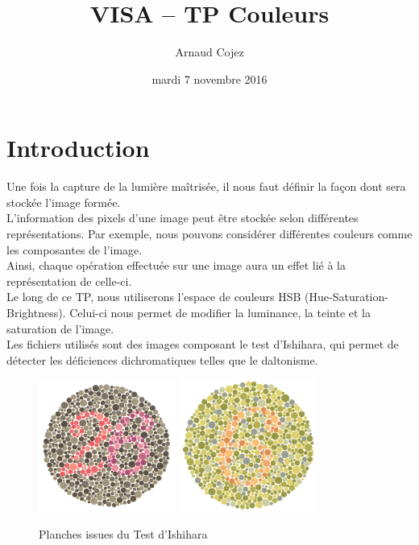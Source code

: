 \documentclass[a4paper]{article}
\begin{document}
\title{VISA -- TP Couleurs}
\author{Arnaud Cojez}
\date{mardi 7 novembre 2016}

\maketitle

\newpage
\tableofcontents
\newpage

\section{Introduction}
Une fois la capture de la lumière maîtrisée, il nous faut définir la façon dont sera stockée l'image formée.\\
L'information des pixels d'une image peut être stockée selon différentes représentations. Par exemple, nous pouvons considérer différentes couleurs comme les composantes de l'image.\\
Ainsi, chaque opération effectuée sur une image aura un effet lié à la représentation de celle-ci.\\

Le long de ce TP, nous utiliserons l'espace de couleurs HSB (Hue-Saturation-Brightness). Celui-ci nous permet de modifier la luminance, la teinte et la saturation de l'image.\\
Les fichiers utilisés sont des images composant le test d'Ishihara, qui permet de détecter les déficiences dichromatiques telles que le daltonisme.

\begin{figure}[h]
\begin{center}
\includegraphics[width=170px]{planche_26.png}
\includegraphics[width=170px]{planche_6.png}
\end{center}
\caption{Planches issues du Test d'Ishihara}
\end{figure}
\end{document}
